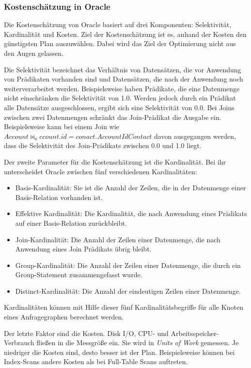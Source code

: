 \subsubsection{Kostenschätzung in Oracle}
Die Kostenschätzung von Oracle basiert auf drei Komponenten: Selektivität, Kardinalität und Kosten. Ziel der Kostenschätzung ist es, anhand der Kosten den günstigsten Plan auszuwählen. Dabei wird das Ziel der Optimierung nicht aus den Augen gelassen.

Die Selektivität bezeichnet das Verhältnis von Datensätzen, die vor Anwendung von Prädikaten vorhanden sind und Datensätzen, die nach der Anwendung noch weiterverarbeitet werden. Beispielsweise haben Prädikate, die eine Datenmenge nicht einschränken die Selektivität von 1.0. Werden jedoch durch ein Prädikat alle Datensätze ausgeschlossen, ergibt sich eine Selektivität von 0.0. Bei Joins zwischen zwei Datenmengen schränkt das Join-Prädikat die Ausgabe ein. Beispielsweise kann bei einem Join wie $Account \Join_account.id=conact.AccountId Contact$ davon ausgegangen werden, dass die Selektivität des Join-Prädikats zwischen 0.0 und 1.0 liegt.

Der zweite Parameter für die Kostenschätzung ist die Kardinalität. Bei ihr unterscheidet Oracle zwischen fünf verschiedenen Kardinalitäten:

\begin{itemize}
\item Basis-Kardinalität: Sie ist die Anzahl der Zeilen, die in der Datenmenge einer Basis-Relation vorhanden ist.
\item Effektive Kardinalität: Die Kardinalität, die nach Anwendung eines Prädikats auf einer Basis-Relation zurückbleibt.
\item Join-Kardinalität: Die Anzahl der Zeilen einer Datenmenge, die nach Anwendung eines Join Prädikats übrig bleibt.
\item Group-Kardinalität: Die Anzahl der Zeilen einer Datenmenge, die durch ein Group-Statement zusammengefasst wurde.
\item Distinct-Kardinalität: Die Anzahl der eindeutigen Zeilen einer Datenmenge.
\end{itemize}

Kardinalitäten können mit Hilfe dieser fünf Kardinalitätsbegriffe für alle Knoten eines Anfragegraphen berechnet werden.

Der letzte Faktor sind die Kosten. Disk I/O, CPU- und Arbeitsspeicher-Verbrauch fließen in die Messgröße ein. Sie wird in \textit{Units of Work} gemessen. Je niedriger die Kosten sind, desto besser ist der Plan. Beispielsweise können bei Index-Scans andere Kosten als bei Full-Table Scans auftreten.






